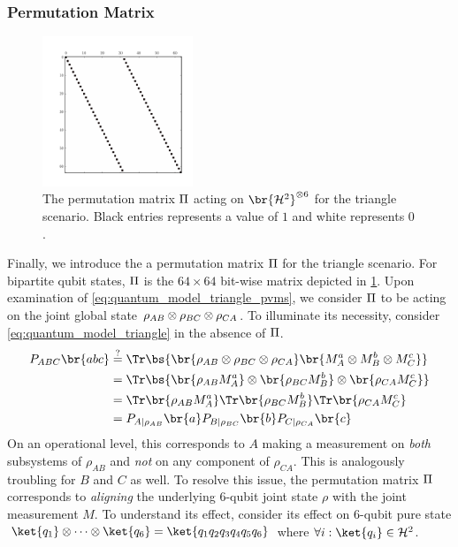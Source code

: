 \documentclass[aps, 10pt, english, twoside, pra, nofootinbib, tightenlines, longbibliography]{revtex4-1}
\begin{document}
    \subsubsection{Permutation Matrix}
    \label{sec:perm_matrix}
    \begin{figure}
        \centering
        \includegraphics[trim={1cm 1.2cm 1.0cm 1cm},clip,width=0.4\textwidth]{../../figures/perm_mtrx.pdf}
        \caption{The permutation matrix $\Pi$ acting on $\br{\Hilb^2}^{\otimes 6}$ for the triangle scenario. Black entries represents a value of $1$ and white represents $0$.}
        \label{fig:perm_mtrx}
    \end{figure}
    Finally, we introduce the a permutation matrix $\Pi$ for the triangle scenario. For bipartite qubit states, $\Pi$ is the $64\times64$ bit-wise matrix depicted in \cref{fig:perm_mtrx}. Upon examination of \cref{eq:quantum_model_triangle_pvms}, we consider $\Pi$ to be acting on the joint global state $\rho_{AB} \otimes \rho_{BC} \otimes \rho_{CA}$. To illuminate its necessity, consider \cref{eq:quantum_model_triangle} in the absence of $\Pi$.
    \begin{align*}
    \prob[\p{ABC}]\br{abc} &\stackrel{?}{=} \Tr\bs{\br{\rho_{\p{AB}} \otimes \rho_{\p{BC}} \otimes \rho_{\p{CA}}} \br{M^a_{\p{A}}\otimes M^b_{\p{B}} \otimes M^c_{\p{C}}}}\\
    &= \Tr\bs{\br{\rho_{\p{AB}}M^a_{\p{A}}}\otimes\br{\rho_{\p{BC}}M^b_{\p{B}}}\otimes\br{\rho_{\p{CA}}M^c_{\p{C}}}}\\
    &= \Tr\br{\rho_{\p{AB}}M^a_{\p{A}}}\Tr\br{\rho_{\p{BC}}M^b_{\p{B}}}\Tr\br{\rho_{\p{CA}}M^c_{\p{C}}}\\
    &= \prob[\p{A}\mid \rho_{\p{AB}}]\br{a}\prob[\p{B}\mid \rho_{\p{BC}}]\br{b}\prob[\p{C}\mid \rho_{\p{CA}}]\br{c}
    \end{align*}
    On an operational level, this corresponds to $A$ making a measurement on \textit{both} subsystems of $\rho_{AB}$ and \textit{not} on any component of $\rho_{CA}$. This is analogously troubling for $B$ and $C$ as well. To resolve this issue, the permutation matrix $\Pi$ corresponds to \textit{aligning} the underlying $6$-qubit joint state $\rho$ with the joint measurement $M$. To understand its effect, consider its effect on $6$-qubit pure state $\ket{q_1} \otimes \cdots \otimes \ket{q_6} = \ket{q_1q_2q_3q_4q_5q_6}$ where $\forall i : \ket{q_i} \in \Hilb^2$.
\end{document}
